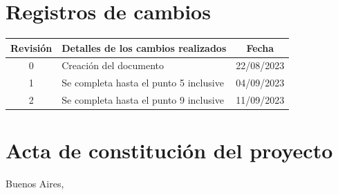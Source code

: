 \documentclass[
11pt, %
codirector, %
]{charter}
\begin{document}
\maketitle
\thispagestyle{empty}
\pagebreak


\thispagestyle{empty}
{\setlength{\parskip}{0pt}
\tableofcontents{}
}
\pagebreak


\section*{Registros de cambios}
\label{sec:registro}


\begin{table}[ht]
\label{tab:registro}
\centering
\begin{tabularx}{\linewidth}{@{}|c|X|c|@{}}
\hline
\rowcolor[HTML]{C0C0C0} 
Revisión & \multicolumn{1}{c|}{\cellcolor[HTML]{C0C0C0}Detalles de los cambios realizados} & Fecha      \\ \hline
0      & Creación del documento                                 & 22/08/2023 \\ \hline
1      & Se completa hasta el punto 5 inclusive                 & 04/09/2023 \\ \hline
2      & Se completa hasta el punto 9 inclusive					& 11/09/2023 \\ \hline
\end{tabularx}
\end{table}

\pagebreak



\section*{Acta de constitución del proyecto}
\label{sec:acta}

\begin{flushright}
Buenos Aires, \fechaInicioName
\end{flushright}

\vspace{2cm}
\end{document}
